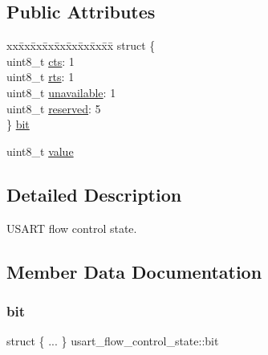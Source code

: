 \subsection*{Public Attributes}
\begin{DoxyCompactItemize}
\item 
\begin{tabbing}
xx\=xx\=xx\=xx\=xx\=xx\=xx\=xx\=xx\=\kill
struct \{\\
\>uint8\_t \hyperlink{unionusart__flow__control__state_a579716d90a8cd50bed8dd41162f26b4a}{cts}: 1\\
\>uint8\_t \hyperlink{unionusart__flow__control__state_a1eab8098c212e1c5bdacf37caceaee7b}{rts}: 1\\
\>uint8\_t \hyperlink{unionusart__flow__control__state_a4d6e301a3de834cd14cef374ce9a3935}{unavailable}: 1\\
\>uint8\_t \hyperlink{unionusart__flow__control__state_a5006a0645bb785ab8cf2a07e517cedec}{reserved}: 5\\
\} \hyperlink{unionusart__flow__control__state_a6ade7bab5cb48566816f4e6d6c429839}{bit}\\

\end{tabbing}\item 
uint8\+\_\+t \hyperlink{unionusart__flow__control__state_a89fd17179ea28972111f4e5822de3e4e}{value}
\end{DoxyCompactItemize}


\subsection{Detailed Description}
U\+S\+A\+RT flow control state. 

\subsection{Member Data Documentation}
\mbox{\label{unionusart__flow__control__state_a6ade7bab5cb48566816f4e6d6c429839}} 
\subsubsection{\texorpdfstring{bit}{bit}}
{\footnotesize\ttfamily struct \{ ... \}   usart\+\_\+flow\+\_\+control\+\_\+state\+::bit}

